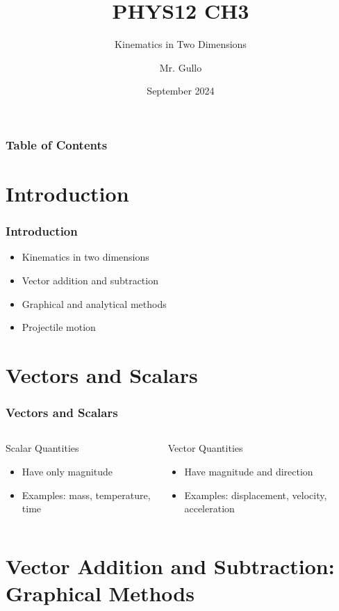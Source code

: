 \documentclass{beamer}
\title[Kinematics in 2D]{PHYS12 CH3}
\subtitle{Kinematics in Two Dimensions}
\author[Mr. Gullo]{Mr. Gullo}
\date[Sept 2024]{September 2024}
\begin{document}
\frame{\titlepage}

\begin{frame}
\frametitle{Table of Contents}
\tableofcontents
\end{frame}

\section{Introduction}

\begin{frame}
\frametitle{Introduction}
\begin{itemize}[<+->]
\item Kinematics in two dimensions
\item Vector addition and subtraction
\item Graphical and analytical methods
\item Projectile motion
\end{itemize}
\end{frame}

\section{Vectors and Scalars}

\begin{frame}
\frametitle{Vectors and Scalars}
\begin{columns}
\begin{block}{Scalar Quantities}
\begin{itemize}
\item Have only magnitude
\item Examples: mass, temperature, time
\end{itemize}
\end{block}

\begin{block}{Vector Quantities}
\begin{itemize}
\item Have magnitude and direction
\item Examples: displacement, velocity, acceleration
\end{itemize}
\end{block}
\end{columns}
\end{frame}

\section{Vector Addition and Subtraction: Graphical Methods}
\end{document}
